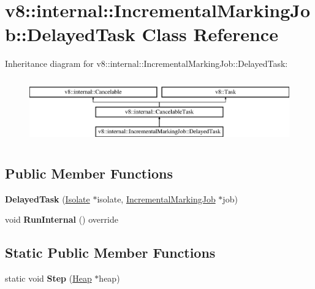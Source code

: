 \hypertarget{classv8_1_1internal_1_1_incremental_marking_job_1_1_delayed_task}{}\section{v8\+:\+:internal\+:\+:Incremental\+Marking\+Job\+:\+:Delayed\+Task Class Reference}
\label{classv8_1_1internal_1_1_incremental_marking_job_1_1_delayed_task}
Inheritance diagram for v8\+:\+:internal\+:\+:Incremental\+Marking\+Job\+:\+:Delayed\+Task\+:\begin{figure}[H]
\begin{center}
\leavevmode
\includegraphics[height=2.809365cm]{classv8_1_1internal_1_1_incremental_marking_job_1_1_delayed_task}
\end{center}
\end{figure}
\subsection*{Public Member Functions}
\begin{DoxyCompactItemize}
\item 
{\bfseries Delayed\+Task} (\hyperlink{classv8_1_1internal_1_1_isolate}{Isolate} $\ast$isolate, \hyperlink{classv8_1_1internal_1_1_incremental_marking_job}{Incremental\+Marking\+Job} $\ast$job)\hypertarget{classv8_1_1internal_1_1_incremental_marking_job_1_1_delayed_task_a342ff70b6fef09abf115a8eb39221c7e}{}\label{classv8_1_1internal_1_1_incremental_marking_job_1_1_delayed_task_a342ff70b6fef09abf115a8eb39221c7e}

\item 
void {\bfseries Run\+Internal} () override\hypertarget{classv8_1_1internal_1_1_incremental_marking_job_1_1_delayed_task_a4586a0d1782d4c87a560f99ddd89df01}{}\label{classv8_1_1internal_1_1_incremental_marking_job_1_1_delayed_task_a4586a0d1782d4c87a560f99ddd89df01}

\end{DoxyCompactItemize}
\subsection*{Static Public Member Functions}
\begin{DoxyCompactItemize}
\item 
static void {\bfseries Step} (\hyperlink{classv8_1_1internal_1_1_heap}{Heap} $\ast$heap)\hypertarget{classv8_1_1internal_1_1_incremental_marking_job_1_1_delayed_task_a9b886589da70d642b327489adc41c5f8}{}\label{classv8_1_1internal_1_1_incremental_marking_job_1_1_delayed_task_a9b886589da70d642b327489adc41c5f8}

\end{DoxyCompactItemize}
